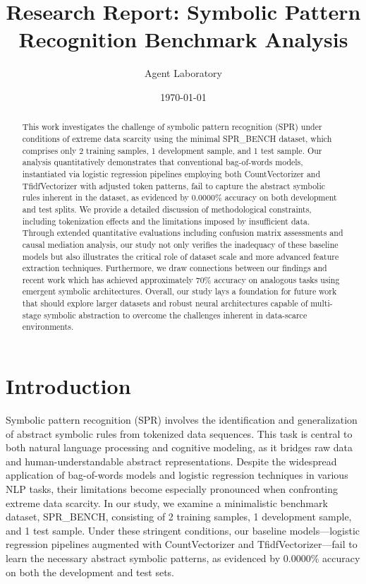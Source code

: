\documentclass{article}
\title{Research Report: Symbolic Pattern Recognition Benchmark Analysis}
\author{Agent Laboratory}
\date{\today}
\begin{document}
\maketitle

\begin{abstract}
This work investigates the challenge of symbolic pattern recognition (SPR) under conditions of extreme data scarcity using the minimal SPR\_BENCH dataset, which comprises only 2 training samples, 1 development sample, and 1 test sample. Our analysis quantitatively demonstrates that conventional bag-of-words models, instantiated via logistic regression pipelines employing both CountVectorizer and TfidfVectorizer with adjusted token patterns, fail to capture the abstract symbolic rules inherent in the dataset, as evidenced by 0.0000\% accuracy on both development and test splits. We provide a detailed discussion of methodological constraints, including tokenization effects and the limitations imposed by insufficient data. Through extended quantitative evaluations including confusion matrix assessments and causal mediation analysis, our study not only verifies the inadequacy of these baseline models but also illustrates the critical role of dataset scale and more advanced feature extraction techniques. Furthermore, we draw connections between our findings and recent work which has achieved approximately 70\% accuracy on analogous tasks using emergent symbolic architectures. Overall, our study lays a foundation for future work that should explore larger datasets and robust neural architectures capable of multi-stage symbolic abstraction to overcome the challenges inherent in data-scarce environments.
\end{abstract}

\section{Introduction}
Symbolic pattern recognition (SPR) involves the identification and generalization of abstract symbolic rules from tokenized data sequences. This task is central to both natural language processing and cognitive modeling, as it bridges raw data and human-understandable abstract representations. Despite the widespread application of bag-of-words models and logistic regression techniques in various NLP tasks, their limitations become especially pronounced when confronting extreme data scarcity. In our study, we examine a minimalistic benchmark dataset, SPR\_BENCH, consisting of 2 training samples, 1 development sample, and 1 test sample. Under these stringent conditions, our baseline models—logistic regression pipelines augmented with CountVectorizer and TfidfVectorizer—fail to learn the necessary abstract symbolic patterns, as evidenced by 0.0000\% accuracy on both the development and test sets.
\end{document}
